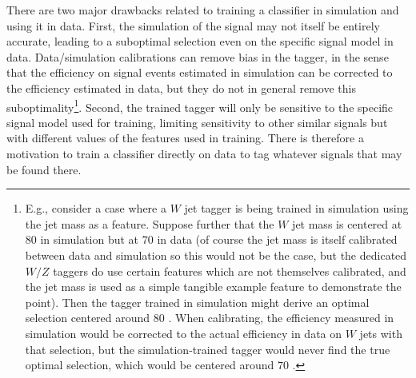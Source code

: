 There are two major drawbacks related to training a classifier in simulation and using it in data.
First, the simulation of the signal may not itself be entirely accurate, leading to a suboptimal selection even on the specific signal model in data.
Data/simulation calibrations can remove bias in the tagger, in the sense that the efficiency on signal events estimated in simulation can be corrected to the efficiency estimated in data, but they do not in general remove this suboptimality\footnote{E.g., consider a case where a $W$ jet tagger is being trained in simulation using the jet mass as a feature. Suppose further that the $W$ jet mass is centered at $80$ \GeV{} in simulation but at $70$ \GeV{} in data (of course the jet mass is itself calibrated between data and simulation so this would not be the case, but the dedicated $W/Z$ taggers do use certain features which are not themselves calibrated, and the jet mass is used as a simple tangible example feature to demonstrate the point). Then the tagger trained in simulation might derive an optimal selection centered around $80$ \GeV{}. When calibrating, the efficiency measured in simulation would be corrected to the actual efficiency in data on $W$ jets with that selection, but the simulation-trained tagger would never find the true optimal selection, which would be centered around $70$ \GeV{}.}.
Second, the trained tagger will only be sensitive to the specific signal model used for training, limiting sensitivity to other similar signals but with different values of the features used in training.
There is therefore a motivation to train a classifier directly on data to tag whatever signals that may be found there.

